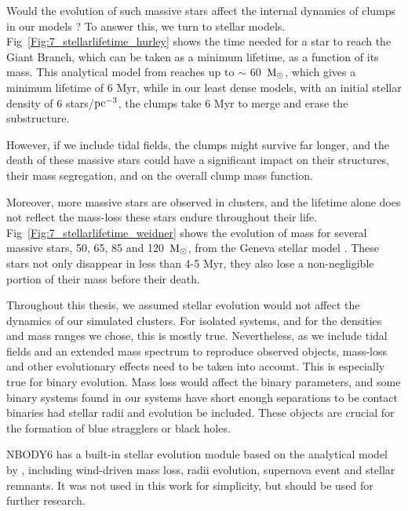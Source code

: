 Would the evolution of such massive stars affect the internal dynamics of clumps in our models ? To answer this, we turn to stellar models. Fig~\ref{Fig:7_stellarlifetime_hurley} shows the time needed for a star to reach the Giant Branch, which can be taken as a minimum lifetime, as a function of its mass. This analytical model from \cite{Hurley2000} reaches up to $\sim$ 60~${\textrm{M}_\odot}$, which gives a minimum lifetime of 6 Myr, while in our least dense models, with an initial stellar density of 6 stars/${\textrm{pc}}^{-3}$, the clumps take 6 Myr to merge and erase the substructure.

However, if we include tidal fields, the clumps might survive far longer, and the death of these massive stars could have a significant impact on their structures, their mass segregation, and  on the overall clump mass function.

Moreover, more massive stars are observed in clusters, and the lifetime alone does not reflect the mass-loss these stars endure throughout their life. Fig~\ref{Fig:7_stellarlifetime_weidner} shows the evolution of mass for several massive stars, 50, 65, 85 and 120~${\textrm{M}_\odot}$, from the Geneva stellar model \citep{Schaller1992}. These stars not only disappear in less than 4-5 Myr, they also lose a non-negligible portion of their mass before their death.

Throughout this thesis, we assumed stellar evolution would not affect the dynamics of our simulated clusters. For isolated systems, and for the densities and mass ranges we chose, this is mostly true. Nevertheless, as we include tidal fields and an extended mass spectrum to reproduce observed objects, mass-loss and other evolutionary effects need to be taken into account. This is especially true for binary evolution. Mass loss would affect the binary parameters, and some binary systems found in our systems have short enough separations to be contact binaries had stellar radii and evolution be included. These objects are crucial for the formation of blue stragglers or black holes.

NBODY6 has a built-in stellar evolution module based on the analytical model by \cite{Hurley2000}, including wind-driven mass loss, radii evolution, supernova event and stellar remnants. It was not used in this work for simplicity, but should be used for further research.



